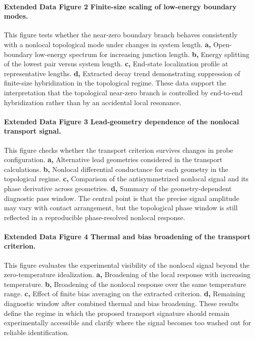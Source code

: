 \paragraph{Extended Data Figure 2 \textbar{} Finite-size scaling of low-energy boundary modes.}
This figure tests whether the near-zero boundary branch behaves consistently with a nonlocal topological mode under changes in system length. \textbf{a,} Open-boundary low-energy spectrum for increasing junction length. \textbf{b,} Energy splitting of the lowest pair versus system length. \textbf{c,} End-state localization profile at representative lengths. \textbf{d,} Extracted decay trend demonstrating suppression of finite-size hybridization in the topological regime. These data support the interpretation that the topological near-zero branch is controlled by end-to-end hybridization rather than by an accidental local resonance.

\paragraph{Extended Data Figure 3 \textbar{} Lead-geometry dependence of the nonlocal transport signal.}
This figure checks whether the transport criterion survives changes in probe configuration. \textbf{a,} Alternative lead geometries considered in the transport calculations. \textbf{b,} Nonlocal differential conductance for each geometry in the topological regime. \textbf{c,} Comparison of the antisymmetrized nonlocal signal and its phase derivative across geometries. \textbf{d,} Summary of the geometry-dependent diagnostic pass window. The central point is that the precise signal amplitude may vary with contact arrangement, but the topological phase window is still reflected in a reproducible phase-resolved nonlocal response.

\paragraph{Extended Data Figure 4 \textbar{} Thermal and bias broadening of the transport criterion.}
This figure evaluates the experimental visibility of the nonlocal signal beyond the zero-temperature idealization. \textbf{a,} Broadening of the local response with increasing temperature. \textbf{b,} Broadening of the nonlocal response over the same temperature range. \textbf{c,} Effect of finite bias averaging on the extracted criterion. \textbf{d,} Remaining diagnostic window after combined thermal and bias broadening. These results define the regime in which the proposed transport signature should remain experimentally accessible and clarify where the signal becomes too washed out for reliable identification.

